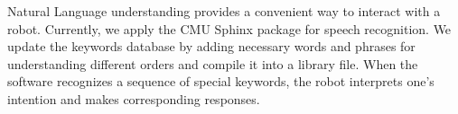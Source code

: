 Natural Language understanding provides a convenient way to interact with a robot. Currently, we apply the CMU Sphinx package for speech recognition. We update the keywords database by adding necessary words and phrases for understanding different orders and compile it into a library file. When the software recognizes a sequence of special keywords, the robot interprets one's intention and makes corresponding responses.
